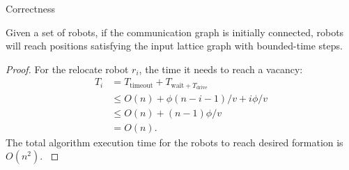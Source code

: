 \begin{frame}{Correctness}
  \begin{theorem}
    Given a set of robots, if the
    communication graph is initially connected, robots will reach
    positions satisfying the input lattice graph with bounded-time steps.
  \end{theorem}
  \begin{proof}
    \small{For the relocate robot $r_i$, the time it needs to reach a vacancy: 
    \begin{equation*}
      \begin{split}
        T_i & = T_{\textrm{timeout}} + T_{\textrm{wait} + T_{\textrm{drive}} }  \\
        & \leq O(n) + \phi(n-i-1)/v + i\phi/v  \\
        & \leq O(n) + (n-1)\phi/v\\
        & = O(n).
      \end{split}
    \end{equation*}
    The total algorithm execution time for the robots to reach desired formation is $O(n^2)$.
    }
  \end{proof}
\end{frame}